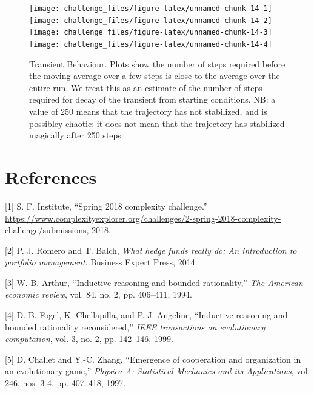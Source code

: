 \documentclass[]{article}
\begin{document}
\begin{figure}[p]

{\centering \texttt{[image: challenge\_files/figure-latex/unnamed-chunk-14-1]} \texttt{[image: challenge\_files/figure-latex/unnamed-chunk-14-2]} \texttt{[image: challenge\_files/figure-latex/unnamed-chunk-14-3]} \texttt{[image: challenge\_files/figure-latex/unnamed-chunk-14-4]} 

}

\caption{\label{fig:plot_ergodic}Transient Behaviour. Plots show the number of steps required before the moving average over a few steps is close to the average over the entire run. We treat this as an estimate of the number of steps required for decay of the transient from starting conditions. NB: a value of 250 means that the trajectory has not stabilized, and is possibley chaotic: it does not mean that the trajectory has stabilized magically after 250 steps. }\label{fig:unnamed-chunk-14}
\end{figure}

\section*{References}\label{references}

\hypertarget{refs}{}
\hypertarget{ref-Challenge:2018}{}
{[}1{]} S. F. Institute, ``Spring 2018 complexity challenge.''
\url{https://www.complexityexplorer.org/challenges/2-spring-2018-complexity-challenge/submissions},
2018.

\hypertarget{ref-romero2014hedge}{}
{[}2{]} P. J. Romero and T. Balch, \emph{What hedge funds really do: An
introduction to portfolio management}. Business Expert Press, 2014.

\hypertarget{ref-arthur1994inductive}{}
{[}3{]} W. B. Arthur, ``Inductive reasoning and bounded rationality,''
\emph{The American economic review}, vol. 84, no. 2, pp. 406--411, 1994.

\hypertarget{ref-fogel1999inductive}{}
{[}4{]} D. B. Fogel, K. Chellapilla, and P. J. Angeline, ``Inductive
reasoning and bounded rationality reconsidered,'' \emph{IEEE
transactions on evolutionary computation}, vol. 3, no. 2, pp. 142--146,
1999.

\hypertarget{ref-challet1997emergence}{}
{[}5{]} D. Challet and Y.-C. Zhang, ``Emergence of cooperation and
organization in an evolutionary game,'' \emph{Physica A: Statistical
Mechanics and its Applications}, vol. 246, nos. 3-4, pp. 407--418, 1997.
\end{document}
